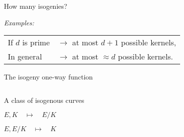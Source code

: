 \documentclass[aspectratio=169]{beamer}
\begin{document}
\begin{frame}{How many isogenies?}
  \large

  \pause
  \vfill

  \emph{Examples:}

  \begin{table}
    \begin{tabular}{l l}
      If $d$ is prime &$→$ at most \emph{$d+1$} possible kernels,\\[0.5em]
      In general      &$→$ at most \emph{$≈ d$} possible kernels.
    \end{tabular}
  \end{table}
\end{frame}


\begin{frame}{The isogeny one-way function}
  \large
  \begin{columns}
    \begin{column}{0.5\textwidth}
      \begin{description}
        \setlength{\itemsep}{1em}
      \item[Setup:] A class of isogenous curves
      \item[Easy:] $E,K \quad\mapsto\quad E/K$
      \item[Hard:] $E,E/K \quad\mapsto\quad K$
      \end{description}
    \end{column}
    \begin{column}{0.5\textwidth}
      \centering
    \end{column}
  \end{columns}
\end{frame}
\end{document}
